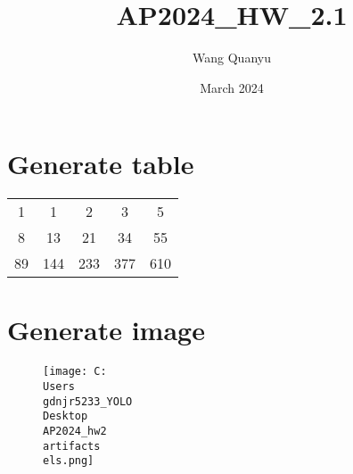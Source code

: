 \documentclass{article}
\title{AP2024\_HW\_2.1}
\author{Wang Quanyu}
\date{March 2024}
\begin{document}
\maketitle

\section{Generate table}
\begin{tabular}{|c|c|c|c|c|}
\hline
1 & 1 & 2 & 3 & 5 \\
8 & 13 & 21 & 34 & 55 \\
89 & 144 & 233 & 377 & 610 \\
\hline
\end{tabular}
    
\section{Generate image}
\begin{figure}[h]
\raggedright
\texttt{[image: C:\\Users\\gdnjr5233\_YOLO\\Desktop\\AP2024\_hw2\\artifacts\\els.png]}
\end{figure}
    
\end{document}
